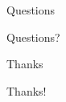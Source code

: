 \documentclass[11pt]{beamer}
\begin{document}
\begin{frame}{Questions}
\begin{center}
\begin{Huge}
Questions?
\end{Huge}
\end{center}
\end{frame}

\begin{frame}{Thanks}
\begin{center}
\begin{Huge}
Thanks!
\end{Huge}
\end{center}
\end{frame}
\end{document}
